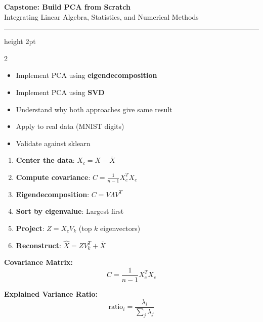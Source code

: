 \documentclass[11pt,letterpaper]{article}
\begin{document}
\begin{center}
{\LARGE\bfseries\color{capstonecolor} Capstone: Build PCA from Scratch}\\[3pt]
{\large Integrating Linear Algebra, Statistics, and Numerical Methods}
\end{center}
\vspace{-5pt}
\hrule height 2pt
\vspace{8pt}

\begin{multicols}{2}

\begin{tcolorbox}[conceptbox, title={\faTrophy\ Learning Goals}]
\begin{itemize}
    \item Implement PCA using \textbf{eigendecomposition}
    \item Implement PCA using \textbf{SVD}
    \item Understand why both approaches give same result
    \item Apply to real data (MNIST digits)
    \item Validate against sklearn
\end{itemize}
\end{tcolorbox}

\begin{tcolorbox}[stepbox, title={\faListOl\ Implementation Steps}]
\begin{enumerate}
    \item \textbf{Center the data}: $X_c = X - \bar{X}$
    \item \textbf{Compute covariance}: $C = \frac{1}{n-1} X_c^T X_c$
    \item \textbf{Eigendecomposition}: $C = V \Lambda V^T$
    \item \textbf{Sort by eigenvalue}: Largest first
    \item \textbf{Project}: $Z = X_c V_k$ (top $k$ eigenvectors)
    \item \textbf{Reconstruct}: $\hat{X} = Z V_k^T + \bar{X}$
\end{enumerate}
\end{tcolorbox}

\columnbreak

\begin{tcolorbox}[formulabox, title={\faCalculator\ Key Formulas}]
\textbf{Covariance Matrix:}
\[ C = \frac{1}{n-1} X_c^T X_c \]

\textbf{Explained Variance Ratio:}
\[ \text{ratio}_i = \frac{\lambda_i}{\sum_j \lambda_j} \]


\end{tcolorbox}
\end{multicols}
\end{document}
